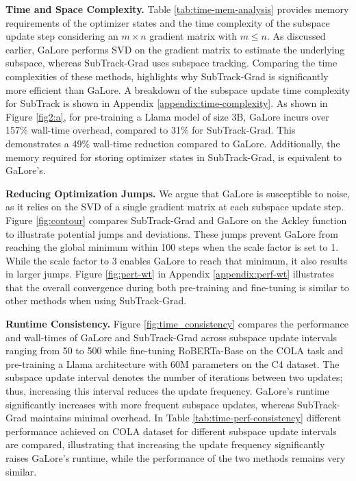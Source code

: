 \noindent\textbf{Time and Space Complexity.}
Table \ref{tab:time-mem-analysis} provides memory requirements of the optimizer states and the time complexity of the subspace update step considering an \(m \times n\) gradient matrix with \(m \le n\). As discussed earlier, GaLore performs SVD on the gradient matrix to estimate the underlying subspace, whereas SubTrack-Grad uses subspace tracking. Comparing the time complexities of these methods, highlights why SubTrack-Grad is significantly more efficient than GaLore. A breakdown of the subspace update time complexity for SubTrack is shown in Appendix \ref{appendix:time-complexity}. 
As shown in Figure \ref{fig2:a}, for pre-training a Llama model of size 3B, GaLore incurs over 157\% wall-time overhead, compared to 31\% for SubTrack-Grad. This demonstrates a 49\% wall-time reduction compared to GaLore. Additionally, the memory required for storing optimizer states in SubTrack-Grad, is equivalent to GaLore’s.

\vspace{2pt}

\noindent\textbf{Reducing Optimization Jumps.} We argue that GaLore is susceptible to noise, as it relies on the SVD of a single gradient matrix at each subspace update step. Figure \ref{fig:contour} compares SubTrack-Grad and GaLore on the Ackley function to illustrate potential jumps and deviations. These jumps prevent GaLore from reaching the global minimum within 100 steps when the scale factor is set to 1. While the scale factor to 3 enables GaLore to reach that minimum, it also results in larger jumps. Figure \ref{fig:pert-wt} in Appendix \ref{appendix:perf-wt} illustrates that the overall convergence during both pre-training and fine-tuning is similar to other methods when using SubTrack-Grad.

\vspace{2pt}

\noindent\textbf{Runtime Consistency.} 
Figure \ref{fig:time_consistency} compares the performance and wall-times of GaLore and SubTrack-Grad across subspace update intervals ranging from 50 to 500 while fine-tuning RoBERTa-Base on the COLA task and pre-training a Llama architecture with 60M parameters on the C4 dataset. The subspace update interval denotes the number of iterations between two updates; thus, increasing this interval reduces the update frequency. GaLore's runtime significantly increases with more frequent subspace updates, whereas SubTrack-Grad maintains minimal overhead. In Table \ref{tab:time-perf-consistency} different performance achieved on COLA dataset for different subspace update intervals are compared, illustrating that increasing the update frequency significantly raises GaLore's runtime, while the performance of the two methods remains very similar.



